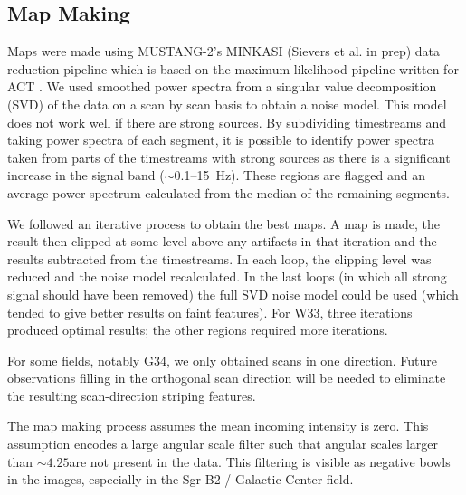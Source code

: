 \documentclass[twocolumn]{aastex62}
\def\todo#1{{\textcolor{red}{TODO: #1}}}
\newcommand{\MUSTANG}{MUSTANG-2\xspace}
\begin{document}
\subsection{Map Making}
Maps were made using \MUSTANG's MINKASI (Sievers et al. in prep) data reduction
pipeline which is based on the maximum likelihood pipeline written for ACT \cite{Dunner2013a}.
We used smoothed power spectra from a singular value decomposition (SVD) of the
data on a scan by scan basis to obtain a noise model.
This model does not work well if there are strong sources.
By subdividing timestreams and taking power spectra of each segment, it is
possible to identify power spectra taken from parts of the timestreams with
strong sources as there is 
a significant increase in the signal band ($\sim$0.1--15~Hz). These regions are
flagged and an average power spectrum calculated from the median of the
remaining segments. 

We followed an iterative process to obtain the best maps.  A map is made, the
result then clipped at some level above any artifacts in that iteration and the
results subtracted from the timestreams.  In each loop, the clipping level was
reduced and the noise model recalculated.  In the last loops (in which all
strong signal should have been removed) the full SVD noise model could be used
(which tended to give better results on faint features). For W33, three
iterations produced optimal results; the other regions required more
iterations.

For some fields, notably G34, we only obtained scans in one direction.  Future
observations filling in the orthogonal scan direction will be needed to eliminate
the resulting scan-direction striping features.

The map making process assumes the mean incoming intensity is zero.  This
assumption encodes a large angular scale filter such that angular scales larger
than $\sim4.25$\arcmin are not present in the data.  This filtering is visible
as negative bowls in the images, especially in the Sgr B2 / Galactic Center
field.
\end{document}
